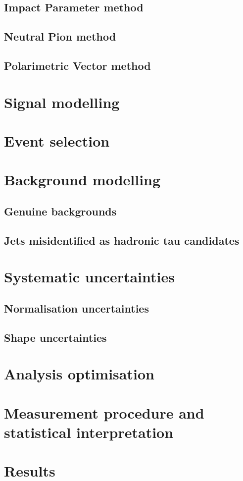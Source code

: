 \documentclass[12pt, a4paper, twoside]{report}
\begin{document}
\subsection{Impact Parameter method}
\subsection{Neutral Pion method}
\subsection{Polarimetric Vector method}
\section{Signal modelling}
\section{Event selection}
\section{Background modelling}
\subsection{Genuine backgrounds}
\subsection{Jets misidentified as hadronic tau candidates}
\section{Systematic uncertainties}
\subsection{Normalisation uncertainties}
\subsection{Shape uncertainties}
\section{Analysis optimisation}
\section{Measurement procedure and statistical interpretation}
\section{Results}
\end{document}
